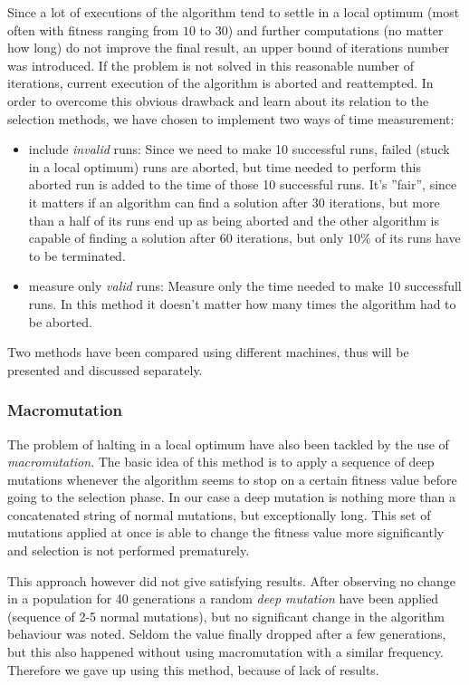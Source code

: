 \documentclass[a4paper]{article}
\begin{document}
Since a lot of executions of the algorithm tend to settle in a local optimum (most often with fitness ranging from $10$ to $30$)
and further computations (no matter how long) do not improve the final result, an upper bound of iterations number was introduced.
If the problem is not solved in this reasonable number of iterations, current execution of the algorithm is aborted and reattempted.
In order to overcome this obvious drawback and learn about its relation to the selection methods, we have chosen to implement two ways of time measurement:
\begin{itemize}
	\item	include \textit{invalid} runs: Since we need to make 10 successful runs, failed (stuck in a local optimum) runs are aborted,
			but time needed to perform this aborted run is added to the time of those 10 successful runs. It's ''fair'', since it matters if
			an algorithm can find a solution after 30 iterations, but more than a half of its runs end up as being aborted and the other algorithm
			is capable of finding a solution after 60 iterations, but only $10\%$ of its runs have to be terminated.
	\item measure only \textit{valid} runs: Measure only the time needed to make 10 successfull runs. In this method it doesn't matter how many times the algorithm had to be aborted.
\end{itemize}

Two methods have been compared using different machines, thus will be presented and discussed separately.

\subsubsection{Macromutation}

The problem of halting in a local optimum have also been tackled by the use of \textit{macromutation}. The basic idea of this method is to apply a sequence of deep mutations whenever the algorithm seems to stop on a certain fitness value before going to the selection phase. In our case a deep mutation is nothing more than a concatenated string of normal mutations, but exceptionally long. This set of mutations applied at once is able to change the fitness value more significantly and selection
is not performed prematurely.

This approach however did not give satisfying results. After observing no change in a population for 40 generations a random \textit{deep mutation} have been applied (sequence of 2-5 normal mutations), but no significant change in the algorithm behaviour was noted. Seldom the value finally dropped after a few generations, but this also happened without using macromutation with a similar frequency. Therefore we gave up using this method, because of lack of results.
\end{document}
